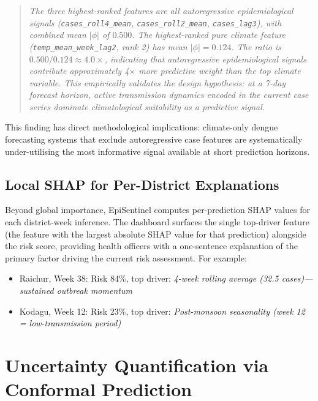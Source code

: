\documentclass[conference]{IEEEtran}
\begin{document}
\begin{quote}
\textit{The three highest-ranked features are all autoregressive
epidemiological signals (\texttt{cases\_roll4\_mean},
\texttt{cases\_roll2\_mean}, \texttt{cases\_lag3}), with combined
mean $|\phi|$ of $0.500$. The highest-ranked pure climate feature
(\texttt{temp\_mean\_week\_lag2}, rank 2) has mean $|\phi| = 0.124$.
The ratio is $0.500 / 0.124 \approx 4.0\times$, indicating that
autoregressive epidemiological signals contribute approximately
4$\times$ more predictive weight than the top climate variable.
This empirically validates the design hypothesis: at a 7-day
forecast horizon, active transmission dynamics encoded in the
current case series dominate climatological suitability as a
predictive signal.}
\end{quote}

This finding has direct methodological implications: climate-only
dengue forecasting systems that exclude autoregressive case features
are systematically under-utilising the most informative signal
available at short prediction horizons.

\subsection{Local SHAP for Per-District Explanations}

Beyond global importance, EpiSentinel computes per-prediction SHAP
values for each district-week inference. The dashboard surfaces the
single top-driver feature (the feature with the largest absolute
SHAP value for that prediction) alongside the risk score, providing
health officers with a one-sentence explanation of the primary factor
driving the current risk assessment. For example:

\begin{itemize}
  \item Raichur, Week 38: Risk 84\%, top driver: \textit{4-week
    rolling average (32.5 cases)---sustained outbreak momentum}
  \item Kodagu, Week 12: Risk 23\%, top driver: \textit{Post-monsoon
    seasonality (week 12 = low-transmission period)}
\end{itemize}

\section{Uncertainty Quantification via Conformal Prediction}
\label{sec:uncertainty}
\end{document}
